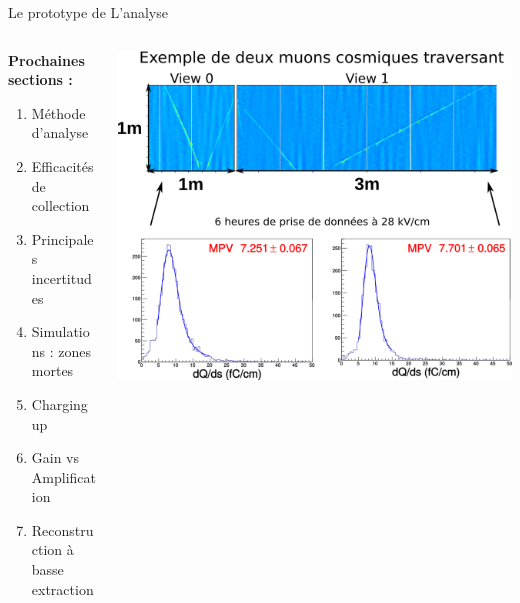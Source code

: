     
    \begin{frame}{Le prototype de \TOO{}}{L'analyse}
        \begin{scriptsize}
       		\vfill
       		\begin{columns}
       			\begin{column}{0.32\textwidth}
           			\textbf{Prochaines sections :}
       				\begin{enumerate}
                        \item Méthode d'analyse
                        \item Efficacités de collection
                        \item Principales incertitudes
                        \item Simulations : zones mortes
                        \item Charging up
                        \item Gain vs Amplification
                        \item Reconstruction à basse extraction
                    \end{enumerate}
       			\end{column}\hfill
       			\begin{column}{0.72\textwidth}
       				\includegraphics[width=\textwidth]{./pictures/run840.png}\\
       			\end{column}
       		\end{columns}
\end{scriptsize}
    \end{frame}

